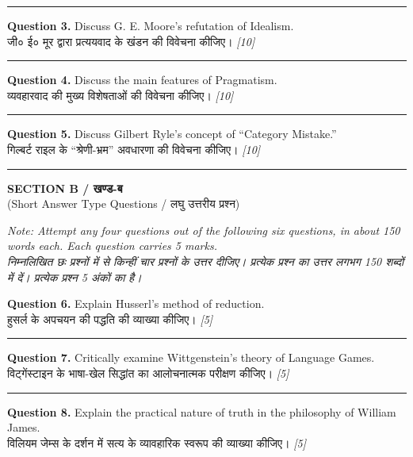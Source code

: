 \documentclass[11pt,a4paper]{article}
\newcommand{\pts}[1]{\hfill \textit{[#1]}}
\begin{document}
\medskip\rule{\linewidth}{0.2pt}\medskip

\noindent \textbf{Question 3.} Discuss G. E. Moore's refutation of Idealism.\\[1pt]
जी० ई० मूर द्वारा प्रत्ययवाद के खंडन की विवेचना कीजिए। \pts{10}

\medskip\rule{\linewidth}{0.2pt}\medskip

\noindent \textbf{Question 4.} Discuss the main features of Pragmatism.\\[1pt]
व्यवहारवाद की मुख्य विशेषताओं की विवेचना कीजिए। \pts{10}

\medskip\rule{\linewidth}{0.2pt}\medskip

\noindent \textbf{Question 5.} Discuss Gilbert Ryle's concept of ``Category Mistake.''\\[1pt]
गिल्बर्ट राइल के ``श्रेणी-भ्रम'' अवधारणा की विवेचना कीजिए। \pts{10}

\bigskip
\rule{\linewidth}{0.2pt}
\bigskip

\begin{center}
  {\large\bfseries SECTION B / खण्ड-ब}\\[2pt]
  {\normalsize (Short Answer Type Questions / लघु उत्तरीय प्रश्न)}
\end{center}

\noindent \textit{Note: Attempt any four questions out of the following six questions, in about 150 words each. Each question carries 5 marks.}\\[2pt]
\noindent \textit{निम्नलिखित छः प्रश्नों में से किन्हीं चार प्रश्नों के उत्तर दीजिए। प्रत्येक प्रश्न का उत्तर लगभग 150 शब्दों में दें। प्रत्येक प्रश्न 5 अंकों का है।}

\bigskip

\noindent \textbf{Question 6.} Explain Husserl's method of reduction.\\[1pt]
हुसर्ल के अपचयन की पद्धति की व्याख्या कीजिए। \pts{5}

\medskip\rule{\linewidth}{0.2pt}\medskip

\noindent \textbf{Question 7.} Critically examine Wittgenstein's theory of Language Games.\\[1pt]
विट्गेंस्टाइन के भाषा-खेल सिद्धांत का आलोचनात्मक परीक्षण कीजिए। \pts{5}

\medskip\rule{\linewidth}{0.2pt}\medskip

\noindent \textbf{Question 8.} Explain the practical nature of truth in the philosophy of William James.\\[1pt]
विलियम जेम्स के दर्शन में सत्य के व्यावहारिक स्वरूप की व्याख्या कीजिए। \pts{5}
\end{document}
